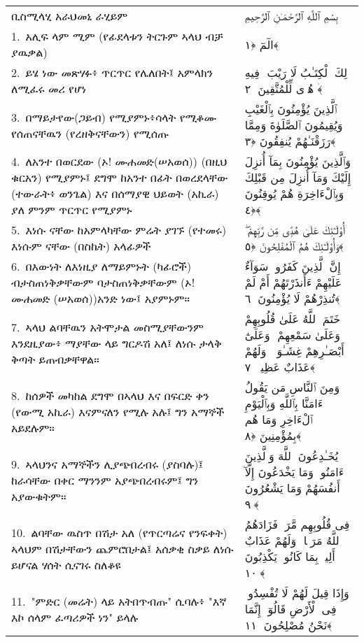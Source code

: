 \documentclass[11pt,a4paper,oneside]{article}%
\newcommand{\mytextarabic}[1]{\textarabic{ #1 \flushright}}
\begin{document}
\begin{longtable}{%
  @{}
    p{}
  @{~~~}
    p{}
    @{}
}
ቢስሚላሂ አራህመኒ ራሂይም &  \mytextarabic{بِسْمِ ٱللَّهِ ٱلرَّحْمَـٰنِ ٱلرَّحِيمِ}     \\
1.\ አሊፍ ላም ሚም (የፊደላቱን ትርጉም ኣላህ ብቻ ያዉቃል)&  \mytextarabic{الٓمٓ ﴿١﴾}  \\
2.\ ይሄ ነው መጽሃፉ፥ ጥርጥር የሌለበት፤ አምላክን ለሚፈሩ መሪ የሆነ &  \mytextarabic{ذَٟلِكَ ٱلْكِتَـٰبُ لَا رَيْبَ ۛ فِيهِ ۛ هُدًۭى لِّلْمُتَّقِينَ ﴿٢﴾}  \\
3.\ በማይታየው(ጋይብ) የሚያምኑ፥ሳላት የሚቆሙ የሰጠናቸዉን (የረዘቅናቸውን) የሚሰጡ & \mytextarabic{ٱلَّذِينَ يُؤْمِنُونَ بِٱلْغَيْبِ وَيُقِيمُونَ ٱلصَّلَوٰةَ وَمِمَّا رَزَقْنَـٰهُمْ يُنفِقُونَ ﴿٣﴾}  \\
4.\ ለአንተ በወርደው (ኦ! ሙሐመድ(ሠአወሰ)) (በዚህ ቁርአን) የሚያምኑ፤ ደግሞ ከአንተ በፊት በወረደላቸው (ተውራት፥ ወንጌል) እና በሰማያዊ ህይወት (አኪራ) ያለ ምንም ጥርጥር የሚያምኑ &  \mytextarabic{وَٱلَّذِينَ يُؤْمِنُونَ بِمَآ أُنزِلَ إِلَيْكَ وَمَآ أُنزِلَ مِن قَبْلِكَ وَبِٱلْءَاخِرَةِ هُمْ يُوقِنُونَ ﴿٤﴾}  \\
5.\ እነሱ ናቸው ከአምላካቸው ምሬት ያገኙ (የተመሩ) እነሱም ናቸው (በስኬት) አላፊዎች &  \mytextarabic{أُو۟لَـٰٓئِكَ عَلَىٰ هُدًۭى مِّن رَّبِّهِمْ ۖ وَأُو۟لَـٰٓئِكَ هُمُ ٱلْمُفْلِحُونَ ﴿٥﴾ }  \\
6.\ በእውነት ለእነዚያ ለማይምኑት (ካፊሮች) ብታስጠነቅቃቸውም ባታስጠነቅቃቸውም (ኦ! ሙሐመድ (ሠአወሰ))አንድ ነው፤ አያምኑም። &  \mytextarabic{إِنَّ ٱلَّذِينَ كَفَرُوا۟ سَوَآءٌ عَلَيْهِمْ ءَأَنذَرْتَهُمْ أَمْ لَمْ تُنذِرْهُمْ لَا يُؤْمِنُونَ ﴿٦﴾}  \\
7.\ ኣላህ ልባቸዉን አትሞታል መስሚያቸውንም እንደዚያው፥ ማያቸው ላይ ግርዶሽ አለ፤ ለነሱ ታላቅ ቅጣት ይጠብቃቸዋል። &  \mytextarabic{خَتَمَ ٱللَّهُ عَلَىٰ قُلُوبِهِمْ وَعَلَىٰ سَمْعِهِمْ ۖ وَعَلَىٰٓ أَبْصَـٰرِهِمْ غِشَـٰوَةٌۭ ۖ وَلَهُمْ عَذَابٌ عَظِيمٌۭ ﴿٧﴾}  \\
8.\ ከሰዎች መካከል ደግሞ በኣላህ እና በፍርድ ቀን (የውሚ አኪራ) እናምናለን  የሚሉ አሉ፤ ግን አማኞች አይደሉም። &  \mytextarabic{وَمِنَ ٱلنَّاسِ مَن يَقُولُ ءَامَنَّا بِٱللَّهِ وَبِٱلْيَوْمِ ٱلْءَاخِرِ وَمَا هُم بِمُؤْمِنِينَ ﴿٨﴾}  \\
9.\ ኣላህንና አማኞችን ሊያጭበረብሩ (ያስባሉ)፤  ከራሳቸው በቀር ማንንም አያጭበረብሩም፤ ግን አያውቁትም። &  \mytextarabic{يُخَـٰدِعُونَ ٱللَّهَ وَٱلَّذِينَ ءَامَنُوا۟ وَمَا يَخْدَعُونَ إِلَّآ أَنفُسَهُمْ وَمَا يَشْعُرُونَ ﴿٩﴾}  \\
10.\ ልባቸው ዉስጥ በሽታ አለ (የጥርጣሬና የንፍቀት) ኣላህም በሽታቸውን ጨምሮበታል፤ አሰቃቂ ስቃይ ለነሱ ይሆናል ሃሰት ሲናገሩ ስለቆዩ & 
 \mytextarabic{ فِى قُلُوبِهِم مَّرَضٌۭ فَزَادَهُمُ ٱللَّهُ مَرَضًۭا ۖ وَلَهُمْ عَذَابٌ أَلِيمٌۢ بِمَا كَانُوا۟ يَكْذِبُونَ ﴿١٠﴾}  \\
11.\ "ምድር (መሬት) ላይ አትበጥብጡ" ሲባሉ፥ "እኛ እኮ ሰላም ፈጣሪዎች ነን" ይላሉ &  \mytextarabic{وَإِذَا قِيلَ لَهُمْ لَا تُفْسِدُوا۟ فِى ٱلْأَرْضِ قَالُوٓا۟ إِنَّمَا نَحْنُ مُصْلِحُونَ ﴿١١﴾}  \\

\end{longtable}
\end{document}
